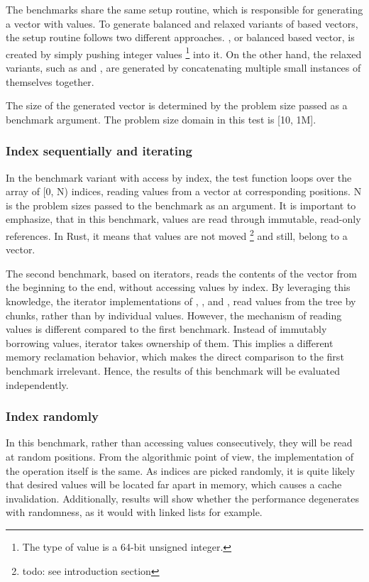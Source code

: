 The benchmarks share the same setup routine, which is responsible for generating a vector with values. To generate balanced and relaxed variants of \rbtree{} based vectors, the setup routine follows two different approaches. \rbvec{}, or balanced \rbtree{} based vector, is created by simply pushing integer values \footnote{The type of value is a 64-bit unsigned integer.} into it. On the other hand, the relaxed variants, such as \rrbvec{} and \pvec{}, are generated by concatenating multiple small instances of themselves together.

The size of the generated vector is determined by the problem size passed as a benchmark argument. The problem size domain in this test is [10, 1M]. 

\subsubsection*{Index sequentially and iterating}
In the benchmark variant with access by index, the test function loops over the array of [0, N) indices, reading values from a vector at corresponding positions. N is the problem sizes passed to the benchmark as an argument. It is important to emphasize, that in this benchmark, values are read through immutable, read-only references. In Rust, it means that values are not moved \footnote{todo: see introduction section} and still, belong to a vector. 

The second benchmark, based on iterators, reads the contents of the vector from the beginning to the end, without accessing values by index. By leveraging this knowledge, the iterator implementations of \rbvec{}, \rrbvec{}, and \pvec{}, read values from the tree by chunks, rather than by individual values. However, the mechanism of reading values is different compared to the first benchmark. Instead of immutably borrowing values, iterator takes ownership of them. This implies a different memory reclamation behavior, which makes the direct comparison to the first benchmark irrelevant. Hence, the results of this benchmark will be evaluated independently. 

\subsubsection*{Index randomly}
In this benchmark, rather than accessing values consecutively, they will be read at random positions. From the algorithmic point of view, the implementation of the operation itself is the same. As indices are picked randomly, it is quite likely that desired values will be located far apart in memory, which causes a cache invalidation. Additionally, results will show whether the performance degenerates with randomness, as it would with linked lists for example. 

